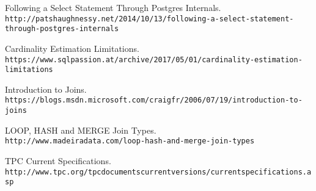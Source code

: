 \begin{thebibliography}{9}
Following a Select Statement Through Postgres Internals.
\\\texttt{http://patshaughnessy.net/2014/10/13/following-a-select-statement-through-postgres-internals} 

Cardinality Estimation Limitations.
\\\texttt{https://www.sqlpassion.at/archive/2017/05/01/cardinality-estimation-limitations} 

Introduction to Joins.
\\\texttt{https://blogs.msdn.microsoft.com/craigfr/2006/07/19/introduction-to-joins} 

LOOP, HASH and MERGE Join Types.
\\\texttt{http://www.madeiradata.com/loop-hash-and-merge-join-types}

TPC Current Specifications.
\\\texttt{http://www.tpc.org/tpc\textunderscore documents\textunderscore current\textunderscore versions/current\textunderscore specifications.asp}
 
\end{thebibliography}